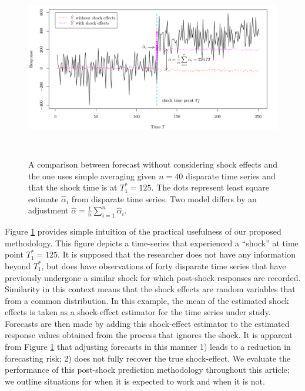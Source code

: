 \documentclass[11pt]{article}
\theoremstyle{definition}
\begin{document}
\begin{figure}[H]
  \begin{center}
    \includegraphics[height = 8cm]{comp.pdf}
    \caption{A comparison between forecast without considering shock effects and the one uses simple averaging given $n=40$ disparate time series and that the shock time is at $T_1^* = 125$. The dots represent least square estimate $\hat{\alpha}_i$ from disparate time series. Two model differs by an adjustment $\hat{\alpha}=\frac{1}{n}\sum_{i=1}^n \hat{\alpha}_i$.}\label{figure1}
  \end{center}  
  \vspace{-.6cm}
\end{figure}

Figure \ref{figure1} provides simple intuition of the practical usefulness of our proposed methodology. This figure depicts a time-series that experienced a ``shock'' at time point $T_1^* = 125$. It is supposed that the researcher does not have any information beyond $T_1^*$, but does have observations of forty disparate time series that have previously undergone a similar shock for which post-shock responses are recorded. Similarity in this context means that the shock effects are random variables that from a common distribution.
In this example, the mean of the estimated shock effects is taken as a shock-effect estimator for the time series under study. Forecasts are then made by adding this shock-effect estimator to the estimated response values obtained from the process that ignores the shock. It is apparent from Figure \ref{figure1} that adjusting forecasts in this manner 1) leads to a reduction in forecasting risk; 2) does not fully recover the true shock-effect. We evaluate the performance of this post-shock prediction methodology throughout this article; we outline situations for when it is expected to work and when it is not.
\end{document}
